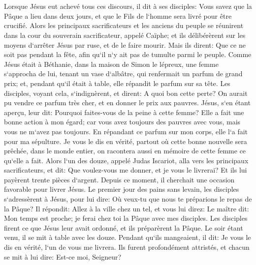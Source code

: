 \chapter{}

\verse Lorsque Jésus eut achevé tous ces discours, il dit à ses disciples: 
\verse Vous savez que la Pâque a lieu dans deux jours, et que le Fils de l`homme sera livré pour être crucifié. 
\verse Alors les principaux sacrificateurs et les anciens du peuple se réunirent dans la cour du souverain sacrificateur, appelé Caïphe; 
\verse et ils délibérèrent sur les moyens d`arrêter Jésus par ruse, et de le faire mourir. 
\verse Mais ils dirent: Que ce ne soit pas pendant la fête, afin qu`il n`y ait pas de tumulte parmi le peuple. 
\verse Comme Jésus était à Béthanie, dans la maison de Simon le lépreux, 
\verse une femme s`approcha de lui, tenant un vase d`albâtre, qui renfermait un parfum de grand prix; et, pendant qu`il était à table, elle répandit le parfum sur sa tête. 
\verse Les disciples, voyant cela, s`indignèrent, et dirent: A quoi bon cette perte? 
\verse On aurait pu vendre ce parfum très cher, et en donner le prix aux pauvres. 
\verse Jésus, s`en étant aperçu, leur dit: Pourquoi faites-vous de la peine à cette femme? Elle a fait une bonne action à mon égard; 
\verse car vous avez toujours des pauvres avec vous, mais vous ne m`avez pas toujours. 
\verse En répandant ce parfum sur mon corps, elle l`a fait pour ma sépulture. 
\verse Je vous le dis en vérité, partout où cette bonne nouvelle sera prêchée, dans le monde entier, on racontera aussi en mémoire de cette femme ce qu`elle a fait. 
\verse Alors l`un des douze, appelé Judas Iscariot, alla vers les principaux sacrificateurs, 
\verse et dit: Que voulez-vous me donner, et je vous le livrerai? Et ils lui payèrent trente pièces d`argent. 
\verse Depuis ce moment, il cherchait une occasion favorable pour livrer Jésus. 
\verse Le premier jour des pains sans levain, les disciples s`adressèrent à Jésus, pour lui dire: Où veux-tu que nous te préparions le repas de la Pâque? 
\verse Il répondit: Allez à la ville chez un tel, et vous lui direz: Le maître dit: Mon temps est proche; je ferai chez toi la Pâque avec mes disciples. 
\verse Les disciples firent ce que Jésus leur avait ordonné, et ils préparèrent la Pâque. 
\verse Le soir étant venu, il se mit à table avec les douze. 
\verse Pendant qu`ils mangeaient, il dit: Je vous le dis en vérité, l`un de vous me livrera. 
\verse Ils furent profondément attristés, et chacun se mit à lui dire: Est-ce moi, Seigneur? 
